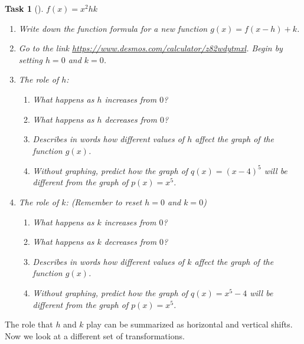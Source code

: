 \documentclass[10pt,]{article}
\theoremstyle{plain}
\newtheorem{proposition}[theorem]{Task}
\theoremstyle{definition}
\numberwithin{equation}{section}
\begin{document}
\begin{proposition}[{}]\label{proposition-38}
\(f(x)=x^2\)\(h\)\(k\)\leavevmode%
\begin{enumerate}
\item\hypertarget{li-189}{}Write down the function formula for a new function \(g(x) = f(x-h)+k\).%
\item\hypertarget{li-190}{}Go to the link \href{https://www.desmos.com/calculator/z82wdytmxl}{https://www.desmos.com/calculator/z82wdytmxl}. Begin by setting \(h = 0\) and \(k=0\).%
\item\hypertarget{li-191}{}\hypertarget{p-99}{}%
The role of \(h\): %
\begin{enumerate}
\item\hypertarget{li-192}{}What happens as \(h\) increases from \(0\)?%
\item\hypertarget{li-193}{}What happens as \(h\) decreases from \(0\)?%
\item\hypertarget{li-194}{}Describes in words how different values of \(h\) affect the graph of the function \(g(x)\).%
\item\hypertarget{li-195}{}Without graphing, predict how the graph of \(q(x)=(x-4)^5\) will be different from the graph of \(p(x)=x^5\).%
\end{enumerate}
%
\item\hypertarget{li-196}{}\hypertarget{p-100}{}%
The role of \(k\): (Remember to reset \(h=0\) and \(k=0\)) %
\begin{enumerate}
\item\hypertarget{li-197}{}What happens as \(k\) increases from \(0\)?%
\item\hypertarget{li-198}{}What happens as \(k\) decreases from \(0\)?%
\item\hypertarget{li-199}{}Describes in words how different values of \(k\) affect the graph of the function \(g(x)\).%
\item\hypertarget{li-200}{}Without graphing, predict how the graph of \(q(x)=x^5-4\) will be different from the graph of \(p(x)=x^5\).%
\end{enumerate}
%
\end{enumerate}
\end{proposition}
\hypertarget{p-101}{}%
The role that \(h\) and \(k\) play can be summarized as horizontal and vertical shifts. Now we look at a different set of transformations.%
\end{document}
